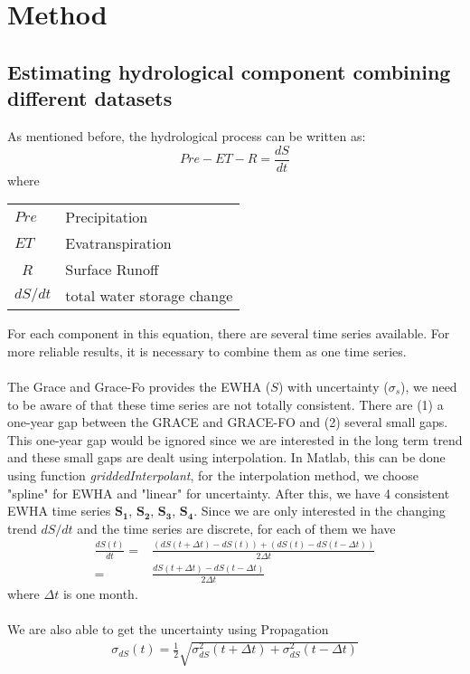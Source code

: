 \chapter{Method}
\section{Estimating hydrological component combining different datasets}
As mentioned before, the hydrological process can be written as:
\begin{equation}
Pre - ET - R = \frac{dS}{dt}
\end{equation}
where
\begin{table}[htbp]
	\begin{tabular}{ll}
		$Pre$   & Precipitation    \\ 
		$ET$    & Evatranspiration \\ \
		$R$     & Surface Runoff \\ 
		$dS / dt$ & total water storage change \\ 
	\end{tabular}
\end{table}
For each component in this equation, there are several time series available. For more reliable results, it is necessary to combine them as one time series.\\\\
The Grace and Grace-Fo provides the EWHA ($S$) with uncertainty ($\sigma_s$), we need to be aware of that these time series are not totally consistent. There are (1) a one-year gap between the GRACE and GRACE-FO and (2) several small gaps. This one-year gap would be ignored since we are interested in the long term trend and these small gaps are dealt using interpolation. In Matlab, this can be done using function \textit{griddedInterpolant}, for the interpolation method, we choose "spline" for EWHA and "linear" for uncertainty. After this, we have 4 consistent EWHA time series $\bm{S_1}$, $\bm{S_2}$, $\bm{S_3}$, $\bm{S_4}$. Since we are only interested in the changing trend $dS / dt$ and the time series are discrete, for each of them we have
\begin{align}
\frac{dS(t)}{dt} = &\frac{(dS(t+\Delta t) - dS(t)) + (dS(t) - dS(t-\Delta t))}{2 \Delta t}\\
= & \frac{dS(t+\Delta t) - dS(t-\Delta t)}{2 \Delta t}
\end{align}
where $\Delta t$ is one month. \\\\
We are also able to get the uncertainty using Propagation
\begin{align}
\sigma_{dS}(t) = \frac{1}{2} \sqrt{\sigma_{dS}^2(t + \Delta t) + \sigma_{dS}^2(t - \Delta t)}
\end{align}
